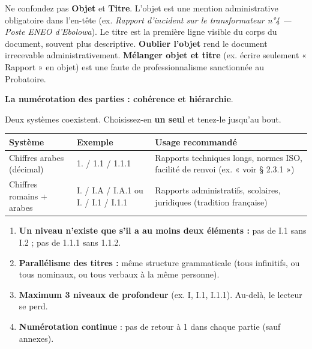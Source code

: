 \documentclass[11pt]{article}
\begin{document}
\begin{attention}
Ne confondez pas \textbf{Objet} et \textbf{Titre}. L'objet est une mention administrative obligatoire dans l'en-tête (ex. \textit{Rapport d'incident sur le transformateur n°4 — Poste ENEO d'Ebolowa}). Le titre est la première ligne visible du corps du document, souvent plus descriptive. \textbf{Oublier l'objet} rend le document irrecevable administrativement. \textbf{Mélanger objet et titre} (ex. écrire seulement « Rapport » en objet) est une faute de professionnalisme sanctionnée au Probatoire.
\end{attention}

\textbf{La numérotation des parties : cohérence et hiérarchie}.\par
Deux systèmes coexistent. Choisissez-en \textbf{un seul} et tenez-le jusqu'au bout.

\begin{center}
\begin{tabularx}{\linewidth}{|l|X|X|}
\hline
\textbf{Système} & \textbf{Exemple} & \textbf{Usage recommandé} \\
\hline
Chiffres arabes (décimal) & 1. / 1.1 / 1.1.1 & Rapports techniques longs, normes ISO, facilité de renvoi (ex. « voir § 2.3.1 ») \\
\hline
Chiffres romains + arabes & I. / I.A / I.A.1 ou I. / I.1 / I.1.1 & Rapports administratifs, scolaires, juridiques (tradition française) \\
\hline
\end{tabularx}
\end{center}

\begin{propriete}
\begin{enumerate}
    \item \textbf{Un niveau n'existe que s'il a au moins deux éléments :} pas de I.1 sans I.2 ; pas de 1.1.1 sans 1.1.2.
    \item \textbf{Parallélisme des titres :} même structure grammaticale (tous infinitifs, ou tous nominaux, ou tous verbaux à la même personne).
    \item \textbf{Maximum 3 niveaux de profondeur} (ex. I, I.1, I.1.1). Au-delà, le lecteur se perd.
    \item \textbf{Numérotation continue} : pas de retour à 1 dans chaque partie (sauf annexes).
\end{enumerate}
\end{propriete}
\end{document}
